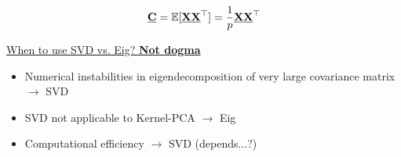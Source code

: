 $$
\underline{\mathbf{C}} = \mathbb{E}[\underline{\mathbf{X}} \underline{\mathbf{X}}^\top] = \frac{1}{p} \underline{\mathbf{X}} \underline{\mathbf{X}}^\top
$$

\underline{When to use SVD vs. Eig? \textbf{Not dogma}}

\begin{itemize}

\item Numerical instabilities in eigendecomposition of very large covariance matrix $\rightarrow$ SVD
\item SVD not applicable to Kernel-PCA $\rightarrow$ Eig
\item Computational efficiency $\rightarrow$ SVD (depends...?)
\end{itemize}
